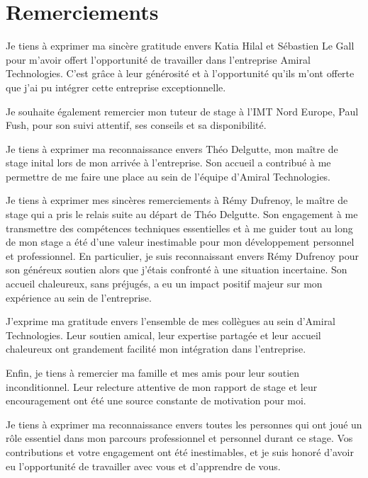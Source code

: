 \section*{Remerciements}
Je tiens à exprimer ma sincère gratitude envers Katia Hilal et Sébastien Le Gall pour m'avoir offert l'opportunité de travailler dans l'entreprise Amiral Technologies.
C'est grâce à leur générosité et à l'opportunité qu'ils m'ont offerte que j'ai pu intégrer cette entreprise exceptionnelle.

Je souhaite également remercier mon tuteur de stage à l'IMT Nord Europe, Paul Fush, pour son suivi attentif, ses conseils et sa disponibilité.

Je tiens à exprimer ma reconnaissance envers Théo Delgutte, mon maître de stage inital lors de mon arrivée à l'entreprise.
Son accueil a contribué à me permettre de me faire une place au sein de l'équipe d'Amiral Technologies.

Je tiens à exprimer mes sincères remerciements à Rémy Dufrenoy, le maître de stage qui a pris le relais suite au départ de Théo Delgutte.
Son engagement à me transmettre des compétences techniques essentielles et à me guider tout au long de mon stage a été d'une valeur inestimable pour mon développement personnel et professionnel.
En particulier, je suis reconnaissant envers Rémy Dufrenoy pour son généreux soutien alors que j'étais confronté à une situation incertaine.
Son accueil chaleureux, sans préjugés, a eu un impact positif majeur sur mon expérience au sein de l'entreprise.

J'exprime ma gratitude envers l'ensemble de mes collègues au sein d'Amiral Technologies.
Leur soutien amical, leur expertise partagée et leur accueil chaleureux ont grandement facilité mon intégration dans l'entreprise.

Enfin, je tiens à remercier ma famille et mes amis pour leur soutien inconditionnel.
Leur relecture attentive de mon rapport de stage et leur encouragement ont été une source constante de motivation pour moi.

Je tiens à exprimer ma reconnaissance envers toutes les personnes qui ont joué un rôle essentiel dans mon parcours professionnel et personnel durant ce stage.
Vos contributions et votre engagement ont été inestimables, et je suis honoré d'avoir eu l'opportunité de travailler avec vous et d'apprendre de vous.